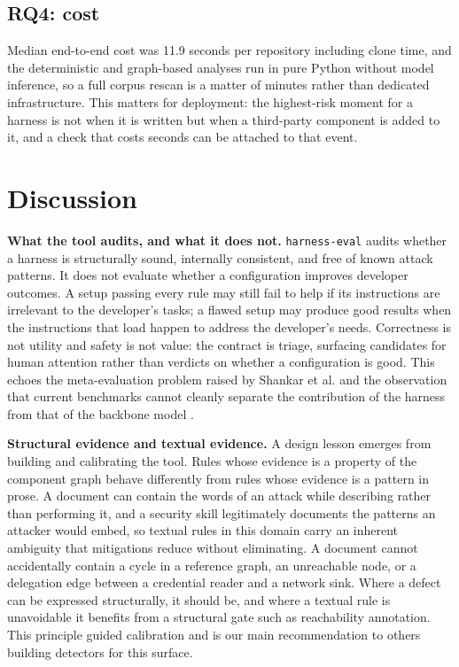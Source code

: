 \documentclass[conference]{IEEEtran}
\begin{document}
\subsection{RQ4: cost}

Median end-to-end cost was 11.9 seconds per repository including clone time, and
the deterministic and graph-based analyses run in pure Python without model
inference, so a full corpus rescan is a matter of minutes rather than dedicated
infrastructure. This matters for deployment: the highest-risk moment for a
harness is not when it is written but when a third-party component is added to
it, and a check that costs seconds can be attached to that event.

\section{Discussion}

\textbf{What the tool audits, and what it does not.} \texttt{harness-eval}
audits whether a harness is structurally sound, internally consistent, and free
of known attack patterns. It does not evaluate whether a configuration improves
developer outcomes. A setup passing every rule may still fail to help if its
instructions are irrelevant to the developer's tasks; a flawed setup may produce
good results when the instructions that load happen to address the developer's
needs. Correctness is not utility and safety is not value: the contract is
triage, surfacing candidates for human attention rather than verdicts on whether
a configuration is good. This echoes the meta-evaluation problem raised by
Shankar et al. \cite{shankar2024validators} and the observation that current
benchmarks cannot cleanly separate the contribution of the harness from that of
the backbone model \cite{ning2026harness}.

\textbf{Structural evidence and textual evidence.} A design lesson emerges from
building and calibrating the tool. Rules whose evidence is a property of the
component graph behave differently from rules whose evidence is a pattern in
prose. A document can contain the words of an attack while describing rather
than performing it, and a security skill legitimately documents the patterns an
attacker would embed, so textual rules in this domain carry an inherent
ambiguity that mitigations reduce without eliminating. A document cannot
accidentally contain a cycle in a reference graph, an unreachable node, or a
delegation edge between a credential reader and a network sink. Where a defect
can be expressed structurally, it should be, and where a textual rule is
unavoidable it benefits from a structural gate such as reachability annotation.
This principle guided calibration and is our main recommendation to others
building detectors for this surface.
\end{document}

